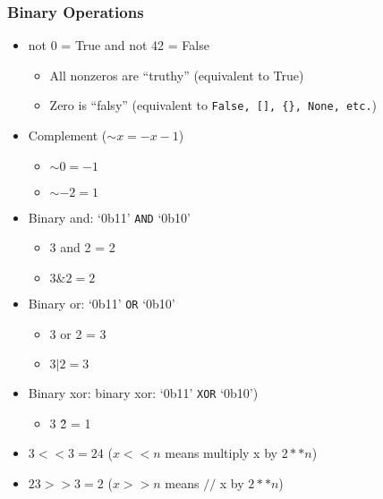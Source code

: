 \documentclass{beamer}
\begin{document}
\begin{frame}
  \frametitle{Binary Operations}

  \begin{itemize}
  \item not 0 = True and not 42 = False
    \begin{itemize}
      \item All nonzeros are ``truthy'' (equivalent to True)
      \item Zero is ``falsy'' (equivalent to \texttt{False, [], \{\}, None, etc.})
    \end{itemize}
  \item Complement ($\sim x = -x -1$)
    \begin{itemize}
      \item $\sim 0 = -1$ 
      \item $\sim -2 = 1$ 
    \end{itemize}
  \item Binary and: `0b11' \texttt{AND} `0b10'
    \begin{itemize}
      \item 3 and 2 = 2
      \item $3 \& 2 = 2$
    \end{itemize}
  \item Binary or: `0b11' \texttt{OR} `0b10'
    \begin{itemize}
      \item 3 or 2 = 3 
      \item $3 | 2 = 3$
    \end{itemize}
  \item Binary xor: binary xor: `0b11' \texttt{XOR} `0b10')
    \begin{itemize}
      \item 3 \^ 2 = 1
    \end{itemize}
  \item $3 << 3 = 24$ ($x << n$ means multiply x by $2**n$)
  \item $23 >> 3 = 2$ ($x >> n$ means $//$ x by $2**n$)
  \end{itemize}
\end{frame}
\end{document}
